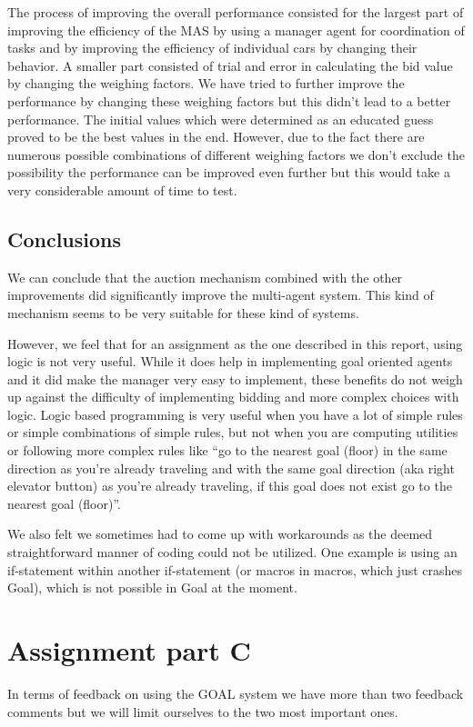 \documentclass[a4paper,11pt]{article}
\begin{document}
The process of improving the overall performance consisted for the largest part of improving the efficiency of the MAS by using a manager agent for coordination of tasks and by improving the efficiency of individual cars by changing their behavior. A smaller part consisted of trial and error in calculating the bid value by changing the weighing factors. We have tried to further improve the performance by changing these weighing factors but this didn't lead to a better performance. The initial values which were determined as an educated guess proved to be the best values in the end. However, due to the fact there are numerous possible combinations of different weighing factors we don't exclude the possibility the performance can be improved even further but this would take a very considerable amount of time to test. 

\subsection{Conclusions}
We can conclude that the auction mechanism combined with the other improvements did significantly improve the multi-agent system. This kind of mechanism seems to be very suitable for these kind of systems.

However, we feel that for an assignment as the one described in this report, using logic is not very useful. While it does help in implementing goal oriented agents and it did make the manager very easy to implement, these benefits do not weigh up against the difficulty of implementing bidding and more complex choices with logic. Logic based programming is very useful when you have a lot of simple rules or simple combinations of simple rules, but not when you are computing utilities or following more complex rules like ``go to the nearest goal (floor) in the same direction as you're already traveling and with the same goal direction (aka right elevator button) as you're already traveling, if this goal does not exist go to the nearest goal (floor)''.

We also felt we sometimes had to come up with workarounds as the deemed straightforward manner of coding could not be utilized. One example is using an if-statement within another if-statement (or macros in macros, which just crashes Goal), which is not possible in Goal at the moment. 

\section{Assignment part C}
In terms of feedback on using the GOAL system we have more than two feedback comments but we will limit ourselves to the two most important ones. 
\end{document}
